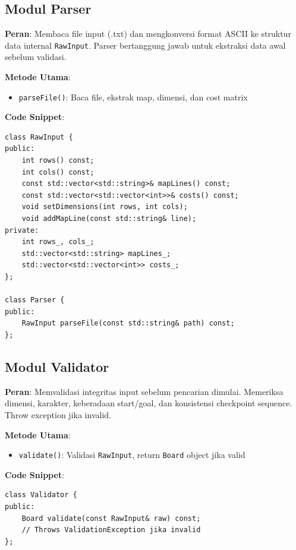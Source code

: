 \subsection{Modul Parser}

\textbf{Peran}: Membaca file input (.txt) dan mengkonversi format ASCII ke struktur data internal \texttt{RawInput}. Parser bertanggung jawab untuk ekstraksi data awal sebelum validasi.

\textbf{Metode Utama}:
\begin{itemize}
    \item \texttt{parseFile()}: Baca file, ekstrak map, dimensi, dan cost matrix
\end{itemize}

\textbf{Code Snippet}:
\begin{tcolorbox}[colback=blue!5, title=Parser Class Header]
    \begin{verbatim}
class RawInput {
public:
    int rows() const;
    int cols() const;
    const std::vector<std::string>& mapLines() const;
    const std::vector<std::vector<int>>& costs() const;
    void setDimensions(int rows, int cols);
    void addMapLine(const std::string& line);
private:
    int rows_, cols_;
    std::vector<std::string> mapLines_;
    std::vector<std::vector<int>> costs_;
};

class Parser {
public:
    RawInput parseFile(const std::string& path) const;
};
\end{verbatim}
\end{tcolorbox}

\subsection{Modul Validator}

\textbf{Peran}: Memvalidasi integritas input sebelum pencarian dimulai. Memeriksa dimensi, karakter, keberadaan start/goal, dan konsistensi checkpoint sequence. Throw exception jika invalid.

\textbf{Metode Utama}:
\begin{itemize}
    \item \texttt{validate()}: Validasi \texttt{RawInput}, return \texttt{Board} object jika valid
\end{itemize}

\textbf{Code Snippet}:
\begin{tcolorbox}[colback=blue!5, title=Validator Class Header]
    \begin{verbatim}
class Validator {
public:
    Board validate(const RawInput& raw) const;
    // Throws ValidationException jika invalid
};
\end{verbatim}
\end{tcolorbox}

